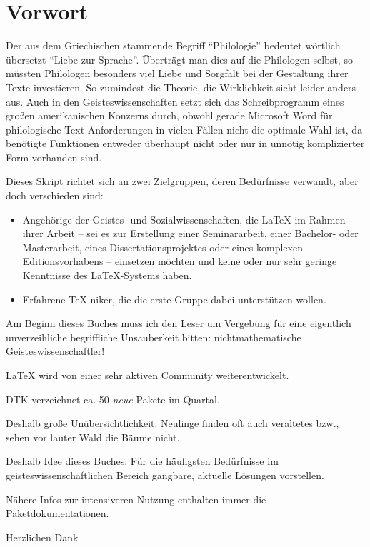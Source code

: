\chapter{Vorwort}

Der aus dem Griechischen stammende Begriff \enquote{Philologie} bedeutet wörtlich übersetzt \enquote{Liebe zur Sprache}. Überträgt man dies auf die Philologen selbst, so müssten Philologen besonders viel Liebe und Sorgfalt bei der Gestaltung ihrer Texte investieren. So zumindest die Theorie, die Wirklichkeit sieht leider anders aus. Auch in den Geisteswissenschaften setzt sich das Schreibprogramm eines großen amerikanischen Konzerns durch, obwohl gerade Microsoft Word für philologische Text-Anforderungen in vielen Fällen nicht die optimale Wahl ist, da benötigte Funktionen entweder überhaupt nicht oder nur in unnötig komplizierter Form vorhanden sind. 

Dieses Skript richtet sich an zwei Zielgruppen, deren Bedürfnisse verwandt, aber doch verschieden sind:

\begin{itemize}
 \item Angehörige der Geistes- und Sozialwissenschaften, die \LaTeX{} im Rahmen ihrer Arbeit
 -- sei es zur Erstellung einer Seminararbeit, einer Bachelor- oder Masterarbeit, eines
 Dissertationsprojektes oder eines komplexen Editionsvorhabens --
 einsetzen möchten und keine oder nur sehr geringe Kenntnisse des \LaTeX{}-Systems haben.
 \item Erfahrene \TeX-niker, die die erste Gruppe dabei unterstützen wollen.
\end{itemize}

Am Beginn dieses Buches muss ich den Leser um Vergebung für eine eigentlich unverzeihliche begriffliche
Unsauberkeit bitten: nichtmathematische Geisteswissenschaftler!

\LaTeX{} wird von einer sehr aktiven Community weiterentwickelt.

DTK verzeichnet ca. 50 \emph{neue} Pakete im Quartal.

Deshalb große Unübersichtlichkeit: Neulinge finden oft auch veraltetes bzw., sehen vor lauter
Wald die Bäume nicht.

Deshalb Idee dieses Buches: Für die häufigsten Bedürfnisse im geisteswissenschaftlichen
Bereich gangbare, aktuelle Lösungen vorstellen.

Nähere Infos zur intensiveren Nutzung enthalten immer die Paketdokumentationen.

Herzlichen Dank 
\endinput
